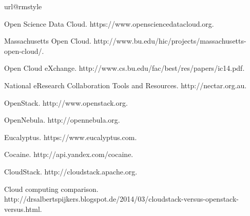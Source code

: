 
%
%
%

\begin{thebibliography}{10}
\providecommand{\url}[1]{#1}
\csname url@rmstyle\endcsname
\providecommand{\newblock}{\relax}
\providecommand{\bibinfo}[2]{#2}
\providecommand\BIBentrySTDinterwordspacing{\spaceskip=0pt\relax}
\providecommand\BIBentryALTinterwordstretchfactor{4}
\providecommand\BIBentryALTinterwordspacing{\spaceskip=\fontdimen2\font plus
\BIBentryALTinterwordstretchfactor\fontdimen3\font minus
  \fontdimen4\font\relax}
\providecommand\BIBforeignlanguage[2]{{%
\expandafter\ifx\csname l@#1\endcsname\relax
\typeout{** WARNING: IEEEtran.bst: No hyphenation pattern has been}%
\typeout{** loaded for the language `#1'. Using the pattern for}%
\typeout{** the default language instead.}%
\else
\language=\csname l@#1\endcsname
\fi
#2}}

Open Science Data Cloud. https://www.opensciencedatacloud.org.

Massachusetts Open Cloud. http://www.bu.edu/hic/projects/massachusetts-open-cloud/.

Open Cloud eXchange. http://www.cs.bu.edu/fac/best/res/papers/ic14.pdf.

National eResearch Collaboration Tools and Resources. http://nectar.org.au.

OpenStack. http://www.openstack.org.

OpenNebula. http://opennebula.org.

Eucalyptus. https://www.eucalyptus.com.

Cocaine. http://api.yandex.com/cocaine.

CloudStack. http://cloudstack.apache.org.

Cloud computing comparison. http://drsalbertspijkers.blogspot.de/2014/03/cloudstack-versus-openstack-versus.html.


\end{thebibliography}



